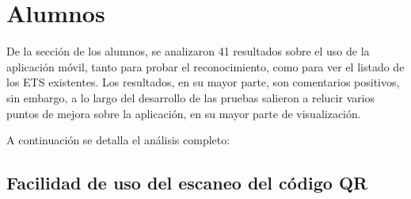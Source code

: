 \section{Alumnos}
De la sección de los alumnos, se analizaron 41 resultados sobre el uso de la aplicación móvil, tanto para probar el reconocimiento, como para ver el listado de los ETS existentes. 
Los resultados, en su mayor parte, son comentarios positivos, sin embargo, a lo largo del desarrollo de las pruebas salieron a relucir varios puntos de mejora sobre la aplicación, en su mayor parte de visualización.

A continuación se detalla el análisis completo:
\subsection{Facilidad de uso del escaneo del código QR}
